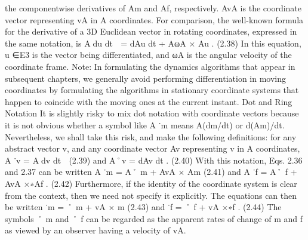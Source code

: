 the componentwise derivatives of Am and Af, respectively. AvA is the coordinate vector representing vA in A coordinates. For comparison, the well-known formula for the derivative of a 3D Euclidean vector in rotating coordinates, expressed in the same notation, is Adu dt  = dAu dt + AωA × Au . (2.38) In this equation, u ∈E3 is the vector being differentiated, and ωA is the angular velocity of the coordinate frame. Note: In formulating the dynamics algorithms that appear in subsequent chapters, we generally avoid performing differentiation in moving coordinates by formulating the algorithms in stationary coordinate systems that happen to coincide with the moving ones at the current instant. Dot and Ring Notation It is slightly risky to mix dot notation with coordinate vectors because it is not obvious whether a symbol like A ˙m means A(dm/dt) or d(Am)/dt. Nevertheless, we shall take this risk, and make the following definitions: for any abstract vector v, and any coordinate vector Av representing v in A coordinates, A ˙v = Adv dt  (2.39) and A˚v = dAv dt . (2.40) With this notation, Eqs. 2.36 and 2.37 can be written A ˙m = A˚ m + AvA × Am (2.41) and A ˙f = A˚ f + AvA ×∗Af . (2.42) Furthermore, if the identity of the coordinate system is clear from the context, then we need not specify it explicitly. The equations can then be written ˙m = ˚ m + vA × m (2.43) and ˙f = ˚ f + vA ×∗f . (2.44) The symbols ˚ m and ˚ f can be regarded as the apparent rates of change of m and f as viewed by an observer having a velocity of vA.

